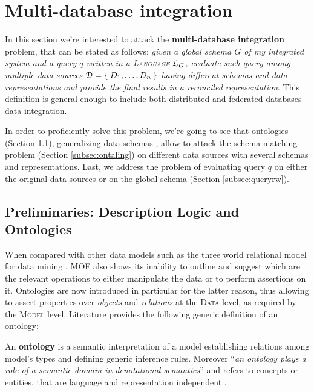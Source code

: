 \section{Multi-database integration}\label{sec:integsurvey}
In this section we're interested to attack the \textbf{multi-database integration} problem, that can be stated as follows: \textit{given a global schema $G$ of my integrated system and a query $q$ written in a  \textsc{Language} $\langg_G$, evaluate such query among multiple data-sources $\mathcal{D}=\Set{D_1,\dots, D_n}$ having   different schemas and data representations and provide the final results in a reconciled representation}. This definition is general enough to include both distributed and federated databases data integration.

In order to proficiently solve this problem, we're going to see that ontologies (Section \ref{sec:ontology}), generalizing data schemas  \cite{GangemiP13}, allow to attack the schema matching problem (Section \ref{subsec:ontaling}) on different data sources with several schemas and representations. Last, we address the problem of evaluating query $q$ on either the original data sources or on the global schema (Section \ref{subsec:queryrw}).



\subsection{Preliminaries: Description Logic and Ontologies}\label{sec:ontology}
When compared with other data models such as the three world relational model for data mining \cite{Calders2006}, MOF also shows its inability to outline and suggest which are the relevant operations to either manipulate the data or to perform assertions on it. Ontologies are now introduced in particular for the latter reason, thus allowing to assert properties over \textit{objects} and \textit{relations} at the \textsc{Data} level, as required by the \textsc{Model} level. Literature provides the following generic definition of an ontology:

\begin{definition}
	\label{def:taonta}
	An \textbf{ontology} \cite{Allemang2011} is a semantic interpretation of a model establishing relations among model's types and defining generic inference rules. Moreover ``\textit{an ontology plays a role of a semantic domain in denotational semantics}'' \cite{saeki} and refers to concepts or entities, that are language  and representation independent \cite{mathmeta}.
\end{definition}

